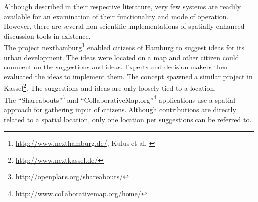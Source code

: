 Although described in their respective literature, very few systems are readily available for an examination of their functionality and mode of operation. However, there are several non-scientific implementations of spatially enhanced discussion tools in existence.\\
The project nexthamburg\footnote{\url{http://www.nexthamburg.de/}, Kulus et al. \cite{Kulus_nexthamburg}} enabled citizens of Hamburg to suggest ideas for its urban development. The ideas were located on a map and other citizen could comment on the suggestions and ideas. Experts and decision makers then evaluated the ideas to implement them. The concept spawned a similar project in Kassel\footnote{\url{http://www.nextkassel.de/}}. The suggestions and ideas are only loosely tied to a location.\\
The ``Shareabouts''\footnote{\url{http://openplans.org/shareabouts/}} and ``CollaborativeMap.org''\footnote{\url{http://www.collaborativemap.org/home/}} applications use a spatial approach for gathering input of citizens. Although contributions are directly related to a spatial location, only one location per suggestions can be referred to.



 
